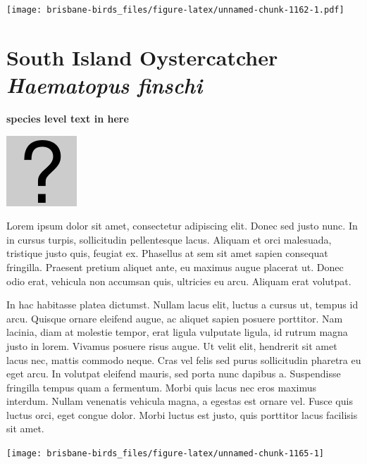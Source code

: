 \documentclass[]{book}
\let\origfigure\figure
\let\endorigfigure\endfigure
\renewenvironment{figure}[1][2] {
  \expandafter\origfigure\expandafter[H]
} {
  \endorigfigure
}
\begin{document}
\texttt{[image: brisbane-birds\_files/figure-latex/unnamed-chunk-1162-1.pdf]}

\section{\texorpdfstring{South Island Oystercatcher \emph{Haematopus
finschi}}{South Island Oystercatcher Haematopus finschi}}\label{south-island-oystercatcher-haematopus-finschi}

\textbf{species level text in here}

\begin{figure}
\centering
\includegraphics{assets/missing.png}
\caption{No image for species}
\end{figure}

Lorem ipsum dolor sit amet, consectetur adipiscing elit. Donec sed justo
nunc. In in cursus turpis, sollicitudin pellentesque lacus. Aliquam et
orci malesuada, tristique justo quis, feugiat ex. Phasellus at sem sit
amet sapien consequat fringilla. Praesent pretium aliquet ante, eu
maximus augue placerat ut. Donec odio erat, vehicula non accumsan quis,
ultricies eu arcu. Aliquam erat volutpat.

In hac habitasse platea dictumst. Nullam lacus elit, luctus a cursus ut,
tempus id arcu. Quisque ornare eleifend augue, ac aliquet sapien posuere
porttitor. Nam lacinia, diam at molestie tempor, erat ligula vulputate
ligula, id rutrum magna justo in lorem. Vivamus posuere risus augue. Ut
velit elit, hendrerit sit amet lacus nec, mattis commodo neque. Cras vel
felis sed purus sollicitudin pharetra eu eget arcu. In volutpat eleifend
mauris, sed porta nunc dapibus a. Suspendisse fringilla tempus quam a
fermentum. Morbi quis lacus nec eros maximus interdum. Nullam venenatis
vehicula magna, a egestas est ornare vel. Fusce quis luctus orci, eget
congue dolor. Morbi luctus est justo, quis porttitor lacus facilisis sit
amet.

\begin{figure}
\texttt{[image: brisbane-birds\_files/figure-latex/unnamed-chunk-1165-1]} \caption{insert figure caption}\label{fig:unnamed-chunk-1165}
\end{figure}
\end{document}
